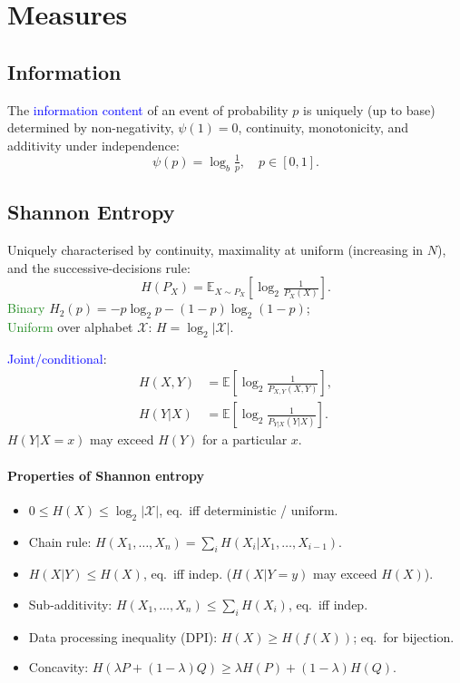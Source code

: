 \section{Measures}
\subsection{Information}
The \textcolor{Blue}{information content} of an event of probability $p$ is uniquely (up to base) determined by \textcolor{Bittersweet}{non-negativity}, \textcolor{Bittersweet}{$\psi(1)=0$}, \textcolor{Bittersweet}{continuity}, \textcolor{Bittersweet}{monotonicity}, and \textcolor{Bittersweet}{additivity under independence}:
\[\psi(p)=\log_b\tfrac{1}{p},\quad p\in[0,1].\]


\subsection{Shannon Entropy}
Uniquely characterised by \textcolor{Bittersweet}{continuity}, \textcolor{Bittersweet}{maximality at uniform} (increasing in $N$), and the \textcolor{Bittersweet}{successive-decisions rule}:
\[H(P_X)=\mathbb{E}_{X\sim P_X}\!\left[\log_2\tfrac{1}{P_X(X)}\right].\]
\textcolor{ForestGreen}{Binary} $H_2(p)=-p\log_2 p-(1-p)\log_2(1-p)$;\\
\textcolor{ForestGreen}{Uniform} over alphabet $\mathcal X$: $H=\log_2|\mathcal X|$.

\textcolor{Blue}{Joint/conditional}:
\begin{align*}
  H(X,Y) & =\mathbb{E}\!\left[\log_2\tfrac{1}{P_{X,Y}(X,Y)}\right],\\
  H(Y|X) & =\mathbb{E}\!\left[\log_2\tfrac{1}{P_{Y|X}(Y|X)}\right].
\end{align*}
$H(Y|X=x)$ may exceed $H(Y)$ for a particular $x$.

\paragraph{Properties of Shannon entropy}
\begin{itemize}
  \item $0\le H(X)\le\log_2|\mathcal X|$, eq.\ iff deterministic / uniform.
  \item \textcolor{Bittersweet}{Chain rule}: \mbox{$H(X_1,\ldots,X_n)=\sum_i H(X_i|X_1,\ldots,X_{i-1})$}.
  \item $H(X|Y)\le H(X)$, eq.\ iff indep. ($H(X|Y=y)$ may exceed $H(X)$).
  \item \textcolor{Bittersweet}{Sub-additivity}: \mbox{$H(X_1,\ldots,X_n)\le\sum_i H(X_i)$}, eq.\ iff indep.
  \item \textcolor{Bittersweet}{Data processing inequality (DPI)}: \mbox{$H(X)\ge H(f(X))$}; eq.\ for bijection.
  \item \textcolor{Bittersweet}{Concavity}: \mbox{$H(\lambda P+(1-\lambda)Q)\ge\lambda H(P)+(1-\lambda)H(Q)$}.
\end{itemize}

